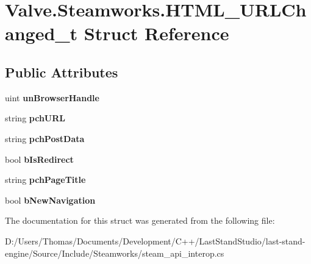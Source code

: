 \hypertarget{structValve_1_1Steamworks_1_1HTML__URLChanged__t}{}\section{Valve.\+Steamworks.\+H\+T\+M\+L\+\_\+\+U\+R\+L\+Changed\+\_\+t Struct Reference}
\label{structValve_1_1Steamworks_1_1HTML__URLChanged__t}
\subsection*{Public Attributes}
\begin{DoxyCompactItemize}
\item 
\hypertarget{structValve_1_1Steamworks_1_1HTML__URLChanged__t_a0adc04269b3f613b1f28e7ea9114d8a2}{}uint {\bfseries un\+Browser\+Handle}\label{structValve_1_1Steamworks_1_1HTML__URLChanged__t_a0adc04269b3f613b1f28e7ea9114d8a2}

\item 
\hypertarget{structValve_1_1Steamworks_1_1HTML__URLChanged__t_ab7a081da7e0946c2ae0ef34dde37ec59}{}string {\bfseries pch\+U\+R\+L}\label{structValve_1_1Steamworks_1_1HTML__URLChanged__t_ab7a081da7e0946c2ae0ef34dde37ec59}

\item 
\hypertarget{structValve_1_1Steamworks_1_1HTML__URLChanged__t_a3376aabc988c8e13dd80b5f7d1ccc597}{}string {\bfseries pch\+Post\+Data}\label{structValve_1_1Steamworks_1_1HTML__URLChanged__t_a3376aabc988c8e13dd80b5f7d1ccc597}

\item 
\hypertarget{structValve_1_1Steamworks_1_1HTML__URLChanged__t_aaf242c7dc00913401b51818a7cc403a0}{}bool {\bfseries b\+Is\+Redirect}\label{structValve_1_1Steamworks_1_1HTML__URLChanged__t_aaf242c7dc00913401b51818a7cc403a0}

\item 
\hypertarget{structValve_1_1Steamworks_1_1HTML__URLChanged__t_afcce09a098318051c7859551d20272f7}{}string {\bfseries pch\+Page\+Title}\label{structValve_1_1Steamworks_1_1HTML__URLChanged__t_afcce09a098318051c7859551d20272f7}

\item 
\hypertarget{structValve_1_1Steamworks_1_1HTML__URLChanged__t_a44aaa18cebe29600e0e2bec867929f11}{}bool {\bfseries b\+New\+Navigation}\label{structValve_1_1Steamworks_1_1HTML__URLChanged__t_a44aaa18cebe29600e0e2bec867929f11}

\end{DoxyCompactItemize}


The documentation for this struct was generated from the following file\+:\begin{DoxyCompactItemize}
\item 
D\+:/\+Users/\+Thomas/\+Documents/\+Development/\+C++/\+Last\+Stand\+Studio/last-\/stand-\/engine/\+Source/\+Include/\+Steamworks/steam\+\_\+api\+\_\+interop.\+cs\end{DoxyCompactItemize}
